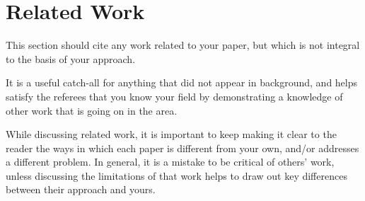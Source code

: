 \section{Related Work}
\label{sec:related-work}

This section should cite any work related to your paper,
but which is not integral to the basis of your approach.

It is a useful catch-all for anything that did not appear
in background, and helps satisfy the referees that you 
know your field by demonstrating a knowledge of other 
work that is going on in the area.

While discussing related work, it is important to keep 
making it clear to the reader the ways in which each paper 
is different from your own, and/or addresses a different
problem. In general, it is a mistake to be critical of 
others' work, unless discussing the limitations of that
work helps to draw out key differences between their 
approach and yours.
